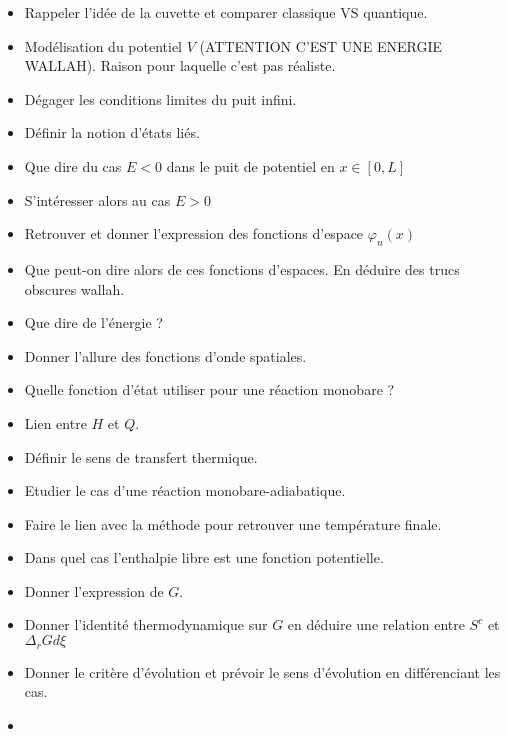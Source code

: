 \documentclass[a4paper, 11pt, hidelinks]{article}
\begin{document}
\begin{itemize}
    \item Rappeler l'idée de la cuvette et comparer classique VS quantique. \cite{Chapitre23}
    \item Modélisation du potentiel $V$ (ATTENTION C'EST UNE ENERGIE WALLAH). Raison pour laquelle c'est pas réaliste. \cite{Chapitre23}
    \item Dégager les conditions limites du puit infini. \cite{Chapitre23}
    \item Définir la notion d'états liés. \cite{Chapitre23}
    \item Que dire du cas $E<0$ dans le puit de potentiel en $x\in [0,L]$ \cite{Chapitre23}
    \item S'intéresser alors au cas $E > 0$ \cite{Chapitre23}
    \item Retrouver et donner l'expression des fonctions d'espace $\varphi_n (x)$ \cite{Chapitre23}
    \item Que peut-on dire alors de ces fonctions d'espaces. En déduire des trucs obscures wallah. \cite{Chapitre23}
    \item Que dire de l'énergie ? \cite{Chapitre23}
    \item Donner l'allure des fonctions d'onde spatiales. \cite{Chapitre23}
    \item Quelle fonction d'état utiliser pour une réaction monobare ? \cite{Chapitre3bis}
    \item Lien entre $H$ et $Q$. \cite{Chapitre3bis}
    \item Définir le sens de transfert thermique. \cite{Chapitre3bis}
    \item Etudier le cas d'une réaction monobare-adiabatique. \cite{Chapitre3bis}
    \item Faire le lien avec la méthode pour retrouver une température finale. \cite{Chapitre3bis}
    \item Dans quel cas l'enthalpie libre est une fonction potentielle. \cite{Chapitre3bis}
    \item Donner l'expression de $G$. \cite{Chapitre3bis}
    \item Donner l'identité thermodynamique sur $G$ en déduire une relation entre $S^c$ et $\Delta_r G d \xi$ \cite{Chapitre3bis}
    \item Donner le critère d'évolution et prévoir le sens d'évolution en différenciant les cas. \cite{Chapitre3bis}
    \item 
\end{itemize}
\end{document}
